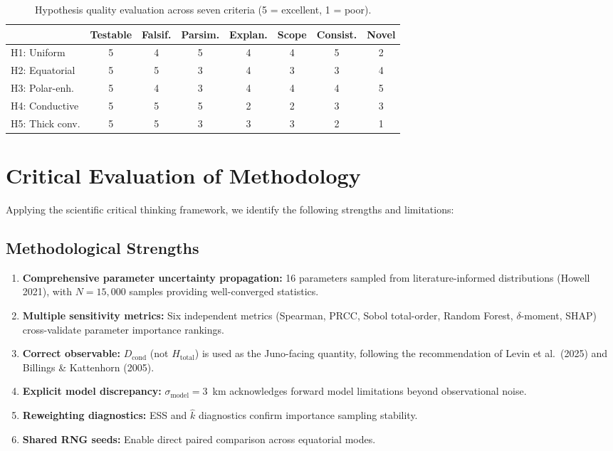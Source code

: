 \documentclass[11pt,letterpaper]{article}
\begin{document}
\begin{table}[htbp]
\centering
\caption{Hypothesis quality evaluation across seven criteria (5 = excellent, 1 = poor).}
\label{tab:hypothesis_quality}
\small
\begin{tabular}{@{}lccccccc@{}}
\toprule
& \textbf{Testable} & \textbf{Falsif.} & \textbf{Parsim.} & \textbf{Explan.} & \textbf{Scope} & \textbf{Consist.} & \textbf{Novel} \\
\midrule
H1: Uniform & 5 & 4 & 5 & 4 & 4 & 5 & 2 \\
H2: Equatorial & 5 & 5 & 3 & 4 & 3 & 3 & 4 \\
H3: Polar-enh. & 5 & 4 & 3 & 4 & 4 & 4 & 5 \\
H4: Conductive & 5 & 5 & 5 & 2 & 2 & 3 & 3 \\
H5: Thick conv. & 5 & 5 & 3 & 3 & 3 & 2 & 1 \\
\bottomrule
\end{tabular}
\end{table}


\section{Critical Evaluation of Methodology}
\label{sec:critique}

Applying the scientific critical thinking framework, we identify the following strengths and limitations:

\subsection{Methodological Strengths}

\begin{enumerate}[nosep]
  \item \textbf{Comprehensive parameter uncertainty propagation:} 16 parameters sampled from literature-informed distributions (Howell 2021), with $N = 15{,}000$ samples providing well-converged statistics.
  \item \textbf{Multiple sensitivity metrics:} Six independent metrics (Spearman, PRCC, Sobol total-order, Random Forest, $\delta$-moment, SHAP) cross-validate parameter importance rankings.
  \item \textbf{Correct observable:} $D_\mathrm{cond}$ (not $H_\mathrm{total}$) is used as the Juno-facing quantity, following the recommendation of Levin et al.\ (2025) and Billings \& Kattenhorn (2005).
  \item \textbf{Explicit model discrepancy:} $\sigma_\mathrm{model} = 3$~km acknowledges forward model limitations beyond observational noise.
  \item \textbf{Reweighting diagnostics:} ESS and $\hat{k}$ diagnostics confirm importance sampling stability.
  \item \textbf{Shared RNG seeds:} Enable direct paired comparison across equatorial modes.
\end{enumerate}
\end{document}
